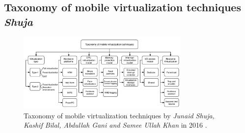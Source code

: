 	\subsection{Taxonomy of mobile virtualization techniques \textit{Shuja}}
	
	\begin{figure}[H]
		\centering
		\includegraphics[width=8.5cm]{images/Shuja2016.pdf}
		\vspace{-0.2cm}
		\caption{Taxonomy of mobile virtualization techniques by \textit{Junaid Shuja, Kashif Bilal, Abdullah Gani and Samee Ullah Khan} in 2016 \cite{Abdulhamid2014}.}
		\label{fig:TaxonomyByShuja}
	\end{figure}
